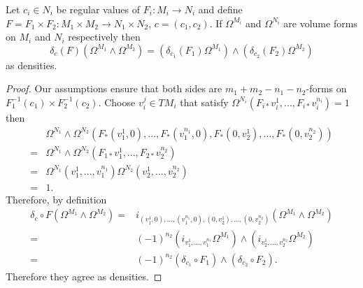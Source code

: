 \begin{proposition}
Let $c_i\in N_i$ be regular values of $F_i:M_i\rightarrow N_i$ and define $F=F_1\times F_2:M_1\times M_2\rightarrow N_1\times N_2$, $c=(c_1,c_2)$.  If $\Omega^{M_i}$ and $\Omega^{N_i}$ are volume forms on $M_i$ and $N_i$ respectively then 
\begin{equation}
\delta_c( F) \left(\Omega^{M_1}\wedge\Omega^{M_2}\right)=\left(\delta_{c_1}( F_1)\Omega^{M_1}\right)\wedge\left(\delta_{c_2}( F_2)\Omega^{M_2}\right)
\end{equation}
as densities.
\end{proposition}
\begin{proof}
Our assumptions ensure that both sides are $m_1+m_2-n_1-n_2$-forms on $F_1^{-1}(c_1)\times F_2^{-1}(c_2)$.  Choose $v_i^j\in TM_i$ that satisfy $\Omega^{N_i}(F_{i*}v^1_i,...,F_{i*}v^{n_i}_i)=1$ then
\begin{align}
&\Omega^{N_1}\wedge \Omega^{N_2}(F_*(v_1^1,0),...,F_*(v_1^{n_1},0),F_*(0,v_2^1),...,F_*(0,v_2^{n_2}))\\
=&\Omega^{N_1}\wedge \Omega^{N_2}(F_{1*}v_1^1,...,F_{2*}v_2^{n_2})\\
=&\Omega^{N_1}(v_1^1,...,v_1^{n_1})\Omega^{N_2}(v_2^1,...,v_2^{n_2})\\
=&1.
\end{align}
Therefore, by definition
\begin{align}
\delta_c\circ F \left(\Omega^{M_1}\wedge\Omega^{M_2}\right)=&i_{(v_1^1,0),...,(v_1^{n_1},0),(0,v_2^1),...,(0,v_2^{n_2})}\left(\Omega^{M_1}\wedge\Omega^{M_2}\right)\\
=&(-1)^{n_2}\left(i_{v_1^1,...,v_1^{n_1}}\Omega^{M_1}\right)\wedge\left(i_{v_2^1,...,v_2^{n_2}}\Omega^{M_2}\right)\\
=&(-1)^{n_2}\left(\delta_{c_1}\circ F_1\right)\wedge\left(\delta_{c_2}\circ F_2\right).
\end{align}
Therefore they agree as densities.
\end{proof}

